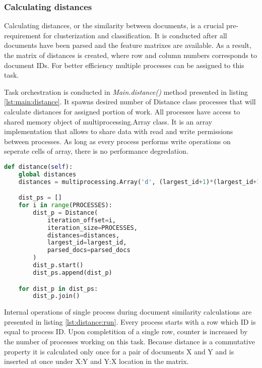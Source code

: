 \subsubsection{Calculating distances}
Calculating distances, or the similarity between documents, is a crucial pre-requirement for clusterization and classification. It is conducted after all documents have been parsed and the feature matrixes are available. As a result, the matrix of distances is created, where row and column numbers corresponds to document IDs. For better efficiency multiple processes can be assigned to this task.

Task orchestration is conducted in \textit{Main.distance()} method presented in listing \ref{lst:main:distance}. It spawns desired number of Distance class processes that will calculate distances for assigned portion of work. All processes have access to shared memory object of multiprocessing.Array class. It is an array implementation that allows to share data with read and write permissions between processes. As long as every process performs write operations on seperate cells of array, there is no performance degredation.

\begin{lstlisting}[language=Python, caption={Main.distance() - Main process method for conducting distance calculations}, label={lst:main:distance}]
def distance(self):
    global distances
    distances = multiprocessing.Array('d', (largest_id+1)*(largest_id+1))

    dist_ps = []
    for i in range(PROCESSES):
        dist_p = Distance(
            iteration_offset=i,
            iteration_size=PROCESSES,
            distances=distances,
            largest_id=largest_id,
            parsed_docs=parsed_docs
        )
        dist_p.start()
        dist_ps.append(dist_p)

    for dist_p in dist_ps:
        dist_p.join()
\end{lstlisting}

Internal operations of single process during document similarity calculations are presented in listing \ref{lst:distance:run}. Every process starts with a row which ID is equal to process ID. Upon completition of a single row, counter is increased by the number of processes working on this task. Because distance is a commutative property it is calculated only once for a pair of documents X and Y and is inserted at once under X:Y and Y:X location in the matrix. 


